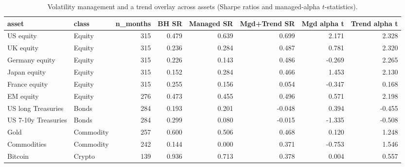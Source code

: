 \begin{table}[htbp]
\centering
\caption{Volatility management and a trend overlay across assets (Sharpe ratios and managed-alpha $t$-statistics).}
\label{tab:crossasset}
\small
\begin{tabular}{llrrrrrr}
\toprule
asset & class & n\_months & BH SR & Managed SR & Mgd+Trend SR & Mgd alpha t & Trend alpha t \\
\midrule
US equity & Equity & 315 & 0.479 & 0.639 & 0.699 & 2.171 & 2.328 \\
UK equity & Equity & 315 & 0.236 & 0.284 & 0.487 & 0.781 & 2.320 \\
Germany equity & Equity & 315 & 0.226 & 0.143 & 0.486 & -0.269 & 2.265 \\
Japan equity & Equity & 315 & 0.152 & 0.284 & 0.466 & 1.453 & 2.130 \\
France equity & Equity & 315 & 0.255 & 0.156 & 0.054 & -0.347 & 0.168 \\
EM equity & Equity & 276 & 0.473 & 0.455 & 0.496 & 0.571 & 2.198 \\
US long Treasuries & Bonds & 284 & 0.193 & 0.201 & -0.048 & 0.394 & -0.455 \\
US 7-10y Treasuries & Bonds & 284 & 0.299 & 0.080 & -0.015 & -1.335 & -0.508 \\
Gold & Commodity & 257 & 0.600 & 0.506 & 0.468 & 0.120 & 1.248 \\
Commodities & Commodity & 242 & 0.144 & 0.000 & 0.371 & -0.753 & 1.546 \\
Bitcoin & Crypto & 139 & 0.936 & 0.713 & 0.378 & 0.004 & 0.557 \\
\bottomrule
\end{tabular}
\end{table}
